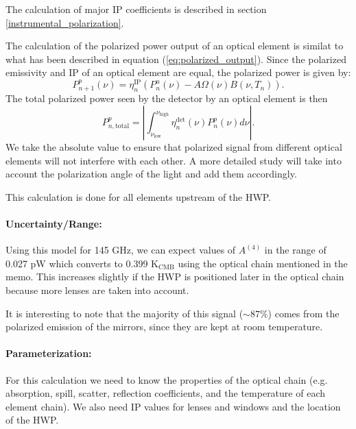 The calculation of major IP coefficients is described in section \ref{instrumental_polarization}.


The calculation of the polarized power output of an optical element is similat to what has been described in equation (\ref{eq:polarized_output}).
Since the polarized emissivity and IP of an optical element are equal, the polarized power is given by:
\begin{equation}
P^p_{n+1}(\nu) = \eta^\text{IP}_n \left(P_n^u (\nu) - A\Omega(\nu) B(\nu, T_n) \right).
\end{equation}
The total polarized power seen by the detector by an optical element is then
\begin{equation}
P^p_{n, \text{total}} = \left|\int_{\nu_\text{low}}^{\nu_\text{high}} \eta_n^\text{det}(\nu) P^p_n(\nu) d\nu\right|.
\end{equation}
We take the absolute value to ensure that polarized signal from different optical elements will not interfere
with each other.
A more detailed study will take into account the polarization angle of the light and add them accordingly.

This calculation is done for all elements upstream of the HWP.

\paragraph{Uncertainty/Range:}
Using this model for 145 GHz, we can expect values of $A^{(4)}$ in the range of 0.027 pW which converts to 0.399 K$_\text{CMB}$ using the optical chain mentioned in the memo. This increases slightly if the HWP is positioned later in the optical chain 
because more lenses are taken into account.

It is interesting to note that the majority of this signal ($\sim 87\%$) comes from the polarized emission of the mirrors, 
since they are kept at room temperature.

\paragraph{Parameterization:}
For this calculation we need to know the properties of the optical chain (e.g. absorption, spill, scatter, reflection coefficients, and 
the temperature of each element chain). We also need IP values for lenses and windows and the location of the HWP. 


